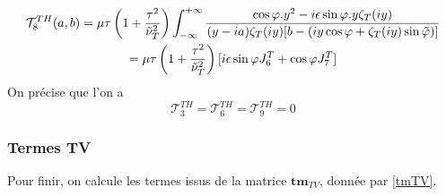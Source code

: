 \begin{multline}
\mathcal{T}_8^{TH}(a,b)=\mu\tau\left(1+\frac{\tau^2}{\nuti_T^2}\right)\int_{-\infty}^{+\infty} \frac{\cos\varphi.y^2-i\epsilon\sin\varphi.y\zeta_T(iy)}{(y-ia)\zeta_T(iy)\lbrack b-(iy\cos \varphi+ \zeta_T(iy)\sin\phiti) \rbrack}\\
\hfill =\mu\tau\left(1+\frac{\tau^2}{\nuti_T^2}\right)\lbrack i\epsilon\sin\varphi J_6^T+\cos\varphi J_7^T\rbrack  \hfill
\end{multline}
On précise que l'on a 
$$ \mathcal{T}_3^{TH}=\mathcal{T}_6^{TH}=\mathcal{T}_9^{TH}=0 $$

\subsubsection{Termes TV}
Pour finir, on calcule les termes issus de la matrice $\mathbf{tm}_{TV}$, donnée par \eqref{tmTV}.

